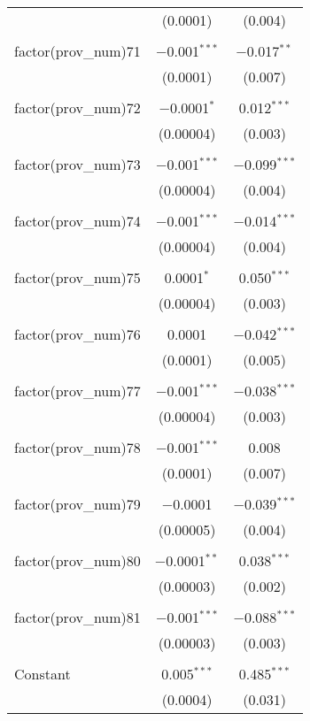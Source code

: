\begin{table}[!htbp]
\begin{tabular}{@{\extracolsep{5pt}}lcc}
  & (0.0001) & (0.004) \\ 
  & & \\ 
 factor(prov\_num)71 & $-$0.001$^{***}$ & $-$0.017$^{**}$ \\ 
  & (0.0001) & (0.007) \\ 
  & & \\ 
 factor(prov\_num)72 & $-$0.0001$^{*}$ & 0.012$^{***}$ \\ 
  & (0.00004) & (0.003) \\ 
  & & \\ 
 factor(prov\_num)73 & $-$0.001$^{***}$ & $-$0.099$^{***}$ \\ 
  & (0.00004) & (0.004) \\ 
  & & \\ 
 factor(prov\_num)74 & $-$0.001$^{***}$ & $-$0.014$^{***}$ \\ 
  & (0.00004) & (0.004) \\ 
  & & \\ 
 factor(prov\_num)75 & 0.0001$^{*}$ & 0.050$^{***}$ \\ 
  & (0.00004) & (0.003) \\ 
  & & \\ 
 factor(prov\_num)76 & 0.0001 & $-$0.042$^{***}$ \\ 
  & (0.0001) & (0.005) \\ 
  & & \\ 
 factor(prov\_num)77 & $-$0.001$^{***}$ & $-$0.038$^{***}$ \\ 
  & (0.00004) & (0.003) \\ 
  & & \\ 
 factor(prov\_num)78 & $-$0.001$^{***}$ & 0.008 \\ 
  & (0.0001) & (0.007) \\ 
  & & \\ 
 factor(prov\_num)79 & $-$0.0001 & $-$0.039$^{***}$ \\ 
  & (0.00005) & (0.004) \\ 
  & & \\ 
 factor(prov\_num)80 & $-$0.0001$^{**}$ & 0.038$^{***}$ \\ 
  & (0.00003) & (0.002) \\ 
  & & \\ 
 factor(prov\_num)81 & $-$0.001$^{***}$ & $-$0.088$^{***}$ \\ 
  & (0.00003) & (0.003) \\ 
  & & \\ 
 Constant & 0.005$^{***}$ & 0.485$^{***}$ \\ 
  & (0.0004) & (0.031) \\ 

\end{tabular}
\end{table}
